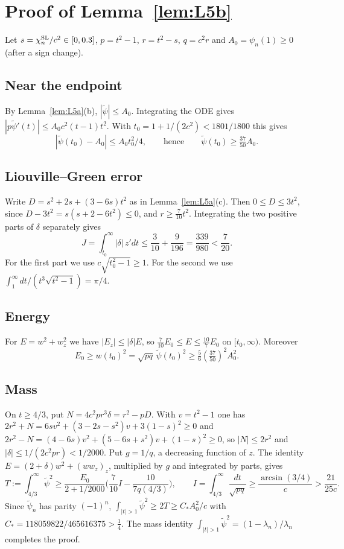 \documentclass[11pt]{amsart}
\theoremstyle{remark}
\numberwithin{equation}{section}
\begin{document}
\section{Proof of Lemma~\ref{lem:L5b}}\label{app:L5b}

Let $s=\chi_n^{\rm SL}/c^2\in[0,0.3]$, $p=t^2-1$, $r=t^2-s$, $q=c^2r$ and $A_0=\psi_n(1)\ge0$ (after a sign change).

\subsection*{Near the endpoint}
By Lemma~\ref{lem:L5a}(b), $|\tilde\psi|\le A_0$. Integrating the ODE gives $|p\tilde\psi'(t)|\le A_0c^2(t-1)t^2$. With $t_0=1+1/(2c^2)<1801/1800$ this gives
\[
|\tilde\psi(t_0)-A_0|\le A_0t_0^2/4,\qquad\text{hence}\qquad\tilde\psi(t_0)\ge\tfrac{37}{50}A_0 .
\]

\subsection*{Liouville--Green error}
Write $D=s^2+2s+(3-6s)t^2$ as in Lemma~\ref{lem:L5a}(c). Then $0\le D\le3t^2$, since $D-3t^2=s(s+2-6t^2)\le0$, and $r\ge\frac7{10}t^2$. Integrating the two positive parts of $\delta$ separately gives
\[
J=\int_{t_0}^\infty|\delta|\,z'dt\le\frac{3}{10}+\frac9{196}=\frac{339}{980}<\frac7{20}.
\]
For the first part we use $c\sqrt{t_0^2-1}\ge1$. For the second we use $\int_1^\infty dt/(t^3\sqrt{t^2-1})=\pi/4$.

\subsection*{Energy}
For $E=w^2+w_z^2$ we have $|E_z|\le|\delta|E$, so $\frac7{10}E_0\le E\le\frac{10}7E_0$ on $[t_0,\infty)$. Moreover
\[
E_0\ge w(t_0)^2=\sqrt{pq}\,\tilde\psi(t_0)^2\ge\tfrac56(\tfrac{37}{50})^2A_0^2 .
\]

\subsection*{Mass}
On $t\ge4/3$, put $N=4c^2pr^3\delta=r^2-pD$. With $v=t^2-1$ one has $2r^2+N=6sv^2+(3-2s-s^2)v+3(1-s)^2\ge0$ and $2r^2-N=(4-6s)v^2+(5-6s+s^2)v+(1-s)^2\ge0$, so $|N|\le2r^2$ and $|\delta|\le1/(2c^2pr)<1/2000$. Put $g=1/q$, a decreasing function of $z$. The identity $E=(2+\delta)w^2+(ww_z)_z$, multiplied by $g$ and integrated by parts, gives
\[
T:=\int_{4/3}^\infty\tilde\psi^2\ge\frac{E_0}{2+1/2000}\Big(\frac7{10}I-\frac{10}{7q(4/3)}\Big),\qquad I=\int_{4/3}^\infty\frac{dt}{\sqrt{pq}}\ge\frac{\arcsin(3/4)}c>\frac{21}{25c}.
\]
Since $\tilde\psi_n$ has parity $(-1)^n$, $\int_{|t|>1}\tilde\psi^2\ge2T\ge C_*A_0^2/c$ with $C_*=118059822/465616375>\frac14$. The mass identity $\int_{|t|>1}\tilde\psi^2=(1-\lambda_n)/\lambda_n$ completes the proof.
\end{document}
